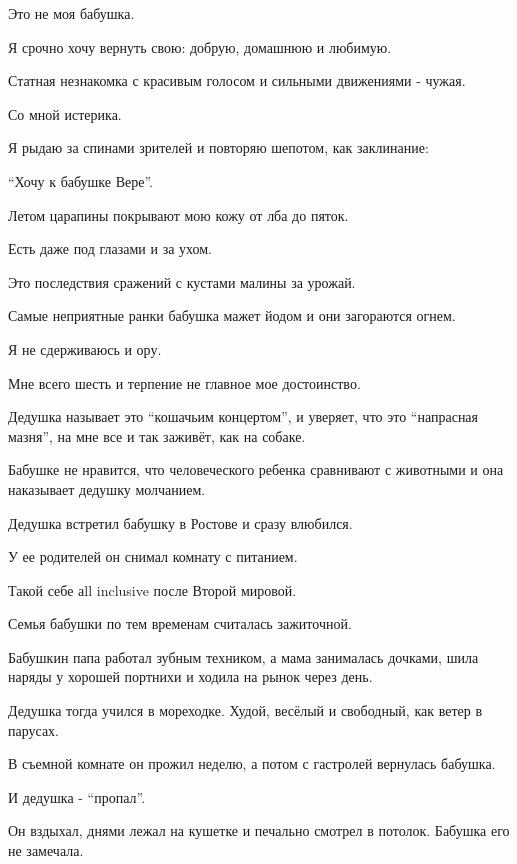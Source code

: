 Это  не моя бабушка. 

Я срочно хочу вернуть свою: добрую, домашнюю и любимую.

Статная незнакомка с красивым голосом и сильными движениями - чужая. 

Со мной истерика.

Я рыдаю за спинами зрителей и повторяю шепотом, как заклинание: 

\enquote{Хочу к бабушке Вере}. 

Летом  царапины покрывают мою кожу  от лба до пяток. 

Есть даже под глазами и за ухом. 

Это последствия сражений с кустами малины за урожай.

Самые неприятные ранки бабушка мажет йодом и  они  загораются огнем. 

Я не сдерживаюсь и ору. 

Мне всего шесть и терпение не главное мое достоинство.

Дедушка называет это \enquote{кошачьим концертом}, и уверяет, что это \enquote{напрасная
мазня},  на мне все и так  заживёт, как на собаке.

Бабушке не нравится, что человеческого  ребенка сравнивают с животными и она
наказывает дедушку молчанием. 

Дедушка встретил бабушку в Ростове  и сразу влюбился. 

У ее родителей он снимал комнату с питанием. 

Такой  себе аll inclusive после Второй мировой.

Семья бабушки   по тем временам считалась  зажиточной. 

Бабушкин папа работал зубным техником, а  мама занималась дочками, шила наряды
у хорошей портнихи и ходила на рынок через день. 

Дедушка тогда учился в мореходке. Худой, весёлый и свободный, как ветер в
парусах. 

В съемной комнате он прожил неделю, а потом с гастролей вернулась бабушка. 

И дедушка -  \enquote{пропал}.

Он вздыхал, днями лежал на кушетке и печально смотрел в потолок. Бабушка его
не замечала.
